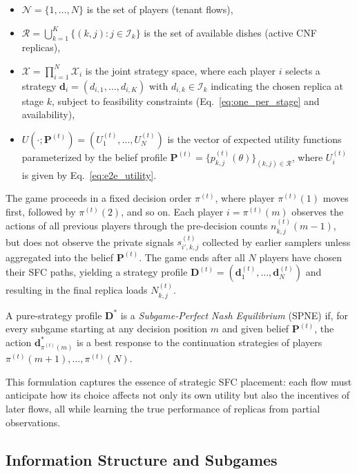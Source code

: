 \documentclass[journal]{IEEEtran}
\theoremstyle{plain}
\theoremstyle{definition}
\theoremstyle{remark}
\begin{document}
\begin{itemize}
    \item $\mathcal{N} = \{1,\dots,N\}$ is the set of players (tenant flows),
    \item $\mathcal{R} = \bigcup_{k=1}^K \{(k,j) : j \in \mathcal{I}_k\}$ is the set of available dishes (active CNF replicas),
    \item $\mathcal{X} = \prod_{i=1}^N \mathcal{X}_i$ is the joint strategy space, where each player $i$ selects a strategy $\mathbf{d}_i = (d_{i,1}, \dots, d_{i,K})$ with $d_{i,k} \in \mathcal{I}_k$ indicating the chosen replica at stage $k$, subject to feasibility constraints (Eq.~\eqref{eq:one_per_stage} and availability),
    \item $U(\cdot; \mathbf{P}^{(t)}) = (U_1^{(t)}, \dots, U_N^{(t)})$ is the vector of expected utility functions parameterized by the belief profile $\mathbf{P}^{(t)} = \{p_{k,j}^{(t)}(\theta)\}_{(k,j)\in\mathcal{R}}$, where $U_i^{(t)}$ is given by Eq.~\eqref{eq:e2e_utility}.
\end{itemize}

The game proceeds in a fixed decision order $\pi^{(t)}$, where player $\pi^{(t)}(1)$ moves first, followed by $\pi^{(t)}(2)$, and so on. Each player $i = \pi^{(t)}(m)$ observes the actions of all previous players through the pre-decision counts $n_{k,j}^{(t)}(m-1)$, but does not observe the private signals $s_{i',k,j}^{(t)}$ collected by earlier samplers unless aggregated into the belief $\mathbf{P}^{(t)}$. The game ends after all $N$ players have chosen their SFC paths, yielding a strategy profile $\mathbf{D}^{(t)} = (\mathbf{d}_1^{(t)}, \dots, \mathbf{d}_N^{(t)})$ and resulting in the final replica loads $N_{k,j}^{(t)}$.

A pure-strategy profile $\mathbf{D}^*$ is a \emph{Subgame-Perfect Nash Equilibrium} (SPNE) if, for every subgame starting at any decision position $m$ and given belief $\mathbf{P}^{(t)}$, the action $\mathbf{d}_{\pi^{(t)}(m)}^*$ is a best response to the continuation strategies of players $\pi^{(t)}(m+1), \dots, \pi^{(t)}(N)$.

This formulation captures the essence of strategic SFC placement: each flow must anticipate how its choice affects not only its own utility but also the incentives of later flows, all while learning the true performance of replicas from partial observations.

\subsection{Information Structure and Subgames}
\label{sec:ibg_subgames}
\end{document}
